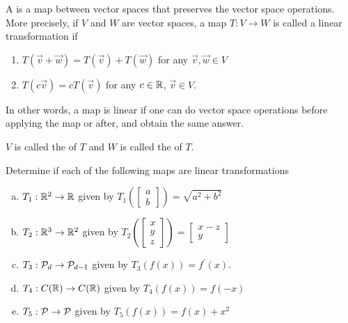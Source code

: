 
\begin{applicationActivities}{1}{17}

\begin{definition}
A  is a map between vector spaces that preserves the vector space operations.  More precisely, if $V$ and $W$ are vector spaces, a map $T:V\rightarrow W$ is called a linear transformation if
\begin{enumerate}
\item $T(\vec{v}+\vec{w}) = T(\vec{v})+T(\vec{w})$ for any $\vec{v},\vec{w} \in V$
\item $T(c\vec{v}) = cT(\vec{v})$ for any $c \in \IR$, $\vec{v} \in V$.
\end{enumerate}
In other words, a map is linear if one can do vector space operations before applying the map or after, and obtain the same answer.

$V$ is called the  of $T$ and $W$ is called the  of $T$.
\end{definition}

\begin{activity}{15}
Determine if each of the following maps are linear transformations
\begin{enumerate}[(a)]
\item $T_1 : \IR^2 \rightarrow \IR$ given by $T_1\left(\begin{bmatrix} a \\ b \end{bmatrix} \right) = \sqrt{a^2+b^2}$
\item $T_2 : \IR^3 \rightarrow \IR^2$ given by $T_2\left(\begin{bmatrix} x \\ y \\ z \end{bmatrix} \right) = \begin{bmatrix} x-z \\ y \end{bmatrix}$
\item $T_3: \P_d \rightarrow \P_{d-1}$ given by $T_3(f(x)) = f^\prime(x)$.
\item $T_4: C(\IR) \rightarrow C(\IR)$ given by $T_4(f(x)) = f(-x)$
\item $T_5: \P \rightarrow \P$ given by $T_5(f(x)) = f(x)+x^2$
\end{enumerate}
\end{activity}


\end{applicationActivities}
